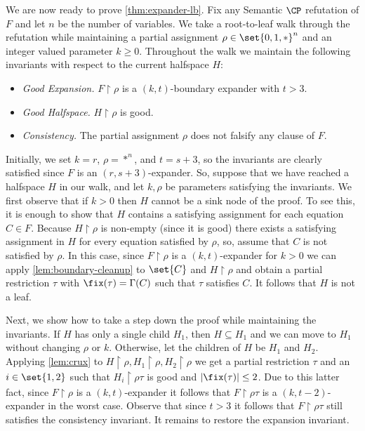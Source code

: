 \documentclass{toc}
\begin{document}
	We are now ready to prove \autoref{thm:expander-lb}.
	Fix any Semantic $\CP$ refutation of $F$ and let $n$ be the number of variables.
	We take a root-to-leaf walk through the refutation while maintaining a partial assignment $\rho \in \set{0,1,*}^n$ and an integer valued parameter $k \geq 0$.
	Throughout the walk we maintain the following invariants with respect to the current halfspace $H$: 
	\begin{itemize}
		\item[--] \emph{Good Expansion.} $F \restriction \rho$ is a $(k, t)$-boundary expander with $t > 3$.
		\item[--] \emph{Good Halfspace.} $H \restriction \rho$ is good.
		\item[--] \emph{Consistency.} The partial assignment $\rho$ does not falsify any clause of $F$.
	\end{itemize}
	
	Initially, we set $k = r$, $\rho = *^n$, and $t=s+3$, so the invariants are clearly satisfied since $F$ is an $(r, s+3)$-expander.
	So, suppose that we have reached a halfspace $H$ in our walk, and let $k, \rho$ be parameters satisfying the invariants.
	We first observe that if $k > 0$ then $H$ cannot be a sink node of the proof.
	To see this, it is enough to show that $H$ contains a satisfying assignment for each equation $C \in F$. 
	Because $H \restriction \rho$ is non-empty (since it is good) there exists a satisfying assignment in $H$ for every equation satisfied by $\rho$, so, 	assume that $C$ is not satisfied by $\rho$. 
	In this case, since $F \restriction \rho$ is a $(k, t)$-expander for $k>0$ we can apply \autoref{lem:boundary-cleanup} to $\set{C}$ and $H \restriction \rho$ and obtain a partial restriction $\tau$ with $\fix(\tau) = \Gamma(C)$ such that $\tau$ satisfies $C$.
	It follows that $H$ is not a leaf.

	Next, we show how to take a step down the proof while maintaining the invariants. 
	If $H$ has only a single child $H_1$, then $H \subseteq H_1$ and we can move to $H_1$ without changing $\rho$ or $k$.
	Otherwise, let the children of $H$ be $H_1$ and $H_2$. 
	Applying \autoref{lem:crux} to $H \restriction \rho, H_1 \restriction \rho, H_2 \restriction \rho$ we get a partial restriction $\tau$ and an $i \in \set{1,2}$ such that $H_i \restriction \rho\tau$ is good and $|\fix(\tau)| \leq 2$.
	Due to this latter fact, since $F \restriction \rho$ is a $(k, t)$-expander it follows that $F \restriction \rho\tau$ is a $(k, t-2)$-expander in the worst case.
	Observe that since $t > 3$ it follows that $F \restriction \rho\tau$ still satisfies the consistency invariant.
	It remains to restore the expansion invariant.
\end{document}
